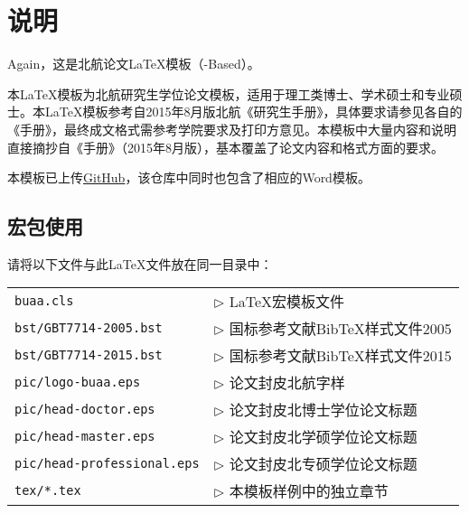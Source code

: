 \chapter{说明}

Again，这是北航论文\LaTeX{}模板（\CTeX{}-Based）\BUAAThesis{}。

本\LaTeX{}模板为北航研究生学位论文模板，适用于理工类博士、学术硕士和专业硕士。本\LaTeX{}模板参考自2015年8月版北航《研究生手册》，具体要求请参见各自的《手册》，最终成文格式需参考学院要求及打印方意见。本模板中大量内容和说明直接摘抄自《手册》（2015年8月版），基本覆盖了论文内容和格式方面的要求。

本模板已上传\href{https://github.com/CheckBoxStudio/BUAAThesis}{GitHub}，该仓库中同时也包含了相应的Word模板。

\section{宏包使用}

请将以下文件与此LaTeX文件放在同一目录中：

\begin{tabular}{ll}
 \verb|buaa.cls |                 & $\triangleright$ LaTeX宏模板文件 \\
 \verb|bst/GBT7714-2005.bst|      & $\triangleright$ 国标参考文献BibTeX样式文件2005 \\
 \verb|bst/GBT7714-2015.bst|      & $\triangleright$ 国标参考文献BibTeX样式文件2015 \\
 \verb|pic/logo-buaa.eps|         & $\triangleright$ 论文封皮北航字样 \\
 \verb|pic/head-doctor.eps|       & $\triangleright$ 论文封皮北博士学位论文标题\\
 \verb|pic/head-master.eps|       & $\triangleright$ 论文封皮北学硕学位论文标题 \\
 \verb|pic/head-professional.eps| & $\triangleright$ 论文封皮北专硕学位论文标题\\
 \verb|tex/*.tex|                 & $\triangleright$ 本模板样例中的独立章节\\
\end{tabular}\\

